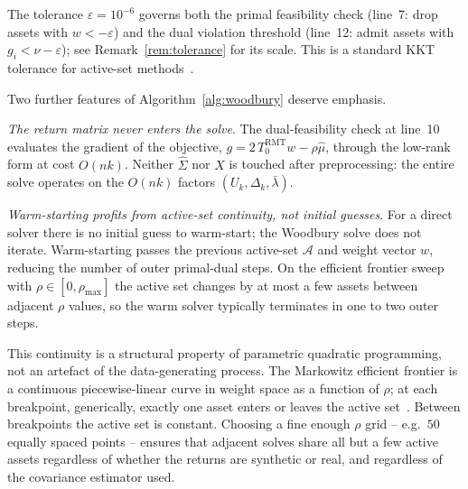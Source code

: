 The tolerance $\varepsilon = 10^{-6}$ governs both the primal feasibility check
(line~7: drop assets with $w < -\varepsilon$) and the dual violation threshold
(line~12: admit assets with $g_i < \nu - \varepsilon$); see
Remark~\ref{rem:tolerance} for its scale. This is a standard KKT tolerance for
active-set methods~\cite{nocedal2006}.

Two further features of Algorithm~\ref{alg:woodbury} deserve emphasis.

\emph{The return matrix never enters the solve}. The dual-feasibility check at
line~10 evaluates the gradient of the objective,
$g = 2\,T_0^{\mathrm{RMT}}w - \rho\hat\mu$, through the low-rank form at cost
$O(nk)$. Neither $\hat\Sigma$ nor $X$ is touched after preprocessing: the
entire solve operates on the $O(nk)$ factors $(U_k, \Delta_k, \bar\lambda)$.

\emph{Warm-starting profits from active-set continuity, not initial guesses}.
For a direct solver there is no initial guess to warm-start; the Woodbury solve
does not iterate. Warm-starting passes the previous active-set $\mathcal{A}$ and
weight vector $w$, reducing the number of outer primal-dual steps. On the
efficient frontier sweep with $\rho \in [0, \rho_{\max}]$ the active set changes
by at most a few assets between adjacent $\rho$ values, so the warm solver
typically terminates in one to two outer steps.

This continuity is a structural property of parametric quadratic programming, not
an artefact of the data-generating process. The Markowitz efficient frontier is a
continuous piecewise-linear curve in weight space as a function of $\rho$; at each
breakpoint, generically, exactly one asset enters or leaves the active set~\cite{markowitz1956}.
Between breakpoints the active set is constant. Choosing a fine enough $\rho$
grid -- e.g.\ $50$ equally spaced points -- ensures that adjacent solves share
all but a few active assets regardless of whether the returns are synthetic or
real, and regardless of the covariance estimator used.

